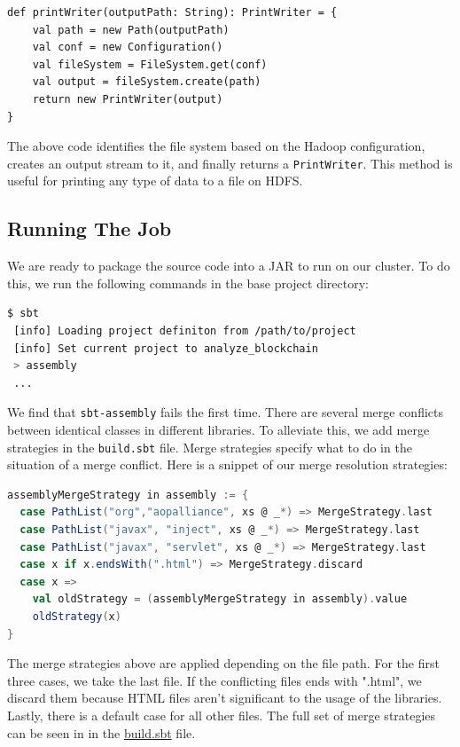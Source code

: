 \documentclass[9pt,twocolumn,twoside]{idsi}
\begin{document}
\begin{lstlisting}
def printWriter(outputPath: String): PrintWriter = {
    val path = new Path(outputPath)
    val conf = new Configuration()
    val fileSystem = FileSystem.get(conf)
    val output = fileSystem.create(path)
    return new PrintWriter(output)
}
\end{lstlisting}

The above code identifies the file system based on the Hadoop configuration, creates an output stream to it, and finally returns a \lstinline{PrintWriter}. This method is useful for printing any type of data to a file on HDFS.

\subsection{Running The Job}
We are ready to package the source code into a JAR to run on our cluster. To do this, we run the following commands in the base project directory:

\begin{lstlisting}[language=bash]
 $ sbt
 [info] Loading project definiton from /path/to/project
 [info] Set current project to analyze_blockchain
 > assembly
 ...
\end{lstlisting}

We find that \lstinline{sbt-assembly} fails the first time. There are several merge conflicts between identical classes in different libraries. To alleviate this, we add merge strategies in the \lstinline{build.sbt} file. Merge strategies specify what to do in the situation of a merge conflict. Here is a snippet of our merge resolution strategies:

\begin{lstlisting}[language=Scala]
assemblyMergeStrategy in assembly := {
  case PathList("org","aopalliance", xs @ _*) => MergeStrategy.last
  case PathList("javax", "inject", xs @ _*) => MergeStrategy.last
  case PathList("javax", "servlet", xs @ _*) => MergeStrategy.last
  case x if x.endsWith(".html") => MergeStrategy.discard
  case x =>
    val oldStrategy = (assemblyMergeStrategy in assembly).value
    oldStrategy(x)
}
\end{lstlisting}

The merge strategies above are applied depending on the file path. For the first three cases, we take the last file. If the conflicting files ends with ".html", we discard them because HTML files aren't significant to the usage of the libraries. Lastly, there is a default case for all other files. The full set of merge strategies can be seen in in the \href{https://github.com/nishilshah17/idsi_bitcoin/blob/d2f1e0257ff684e99356de052eed1c6868ffe82f/analyze_blockchain/build.sbt#L14}{build.sbt} file.
\end{document}
